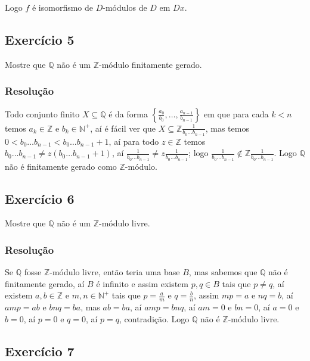 \documentclass[10pt,a4paper]{article}
\begin{document}
\medskip
\noindent
Logo $f$ é isomorfismo de $D$-módulos de $D$ em $Dx$.

\subsection*{Exercício 5}

Mostre que $\mathbb{Q}$ não é um $\mathbb{Z}$-módulo finitamente gerado.

\subsubsection*{Resolução}

Todo conjunto finito $X\subseteq\mathbb{Q}$ é da forma $\left\{\frac{a_0}{b_0},\dots,\frac{a_{n-1}}{b_{n-1}}\right\}$ em que para cada $k<n$ temos $a_k\in\mathbb{Z}$ e $b_k\in\mathbb{N}^+$, aí é fácil ver que $X\subseteq\mathbb{Z}\frac{1}{b_0\dots b_{n-1}}$, mas temos $0<b_0\dots b_{n-1}<b_0\dots b_{n-1}+1$, aí para todo $z\in\mathbb{Z}$ temos $b_0\dots b_{n-1}\neq z(b_0\dots b_{n-1}+1)$, aí $\frac{1}{b_0\dots b_{n-1}}\neq z\frac{1}{b_0\dots b_{n-1}}$; logo $\frac{1}{b_0\dots b_{n-1}}\notin\mathbb{Z}\frac{1}{b_0\dots b_{n-1}}$. Logo $\mathbb{Q}$ não é finitamente gerado como $\mathbb{Z}$-módulo.

\subsection*{Exercício 6}

Mostre que $\mathbb{Q}$ não é um $\mathbb{Z}$-módulo livre.

\subsubsection*{Resolução}

Se $\mathbb{Q}$ fosse $\mathbb{Z}$-módulo livre, então teria uma base $B$, mas sabemos que $\mathbb{Q}$ não é finitamente gerado, aí $B$ é infinito e assim existem $p,q\in B$ tais que $p\neq q$, aí existem $a,b\in\mathbb{Z}$ e $m,n\in\mathbb{N}^+$ tais que $p=\frac{a}{m}$ e $q=\frac{b}{n}$, assim $mp=a$ e $nq=b$, aí $amp=ab$ e $bnq=ba$, mas $ab=ba$, aí $amp=bnq$, aí $am=0$ e $bn=0$, aí $a=0$ e $b=0$, aí $p=0$ e $q=0$, aí $p=q$, contradição. Logo $\mathbb{Q}$ não é $\mathbb{Z}$-módulo livre.

\subsection*{Exercício 7}
\end{document}
